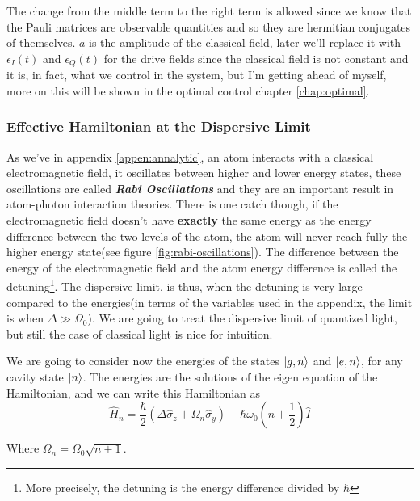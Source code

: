 \documentclass[english, a4paper, 12pt, twoside]{article}
\numberwithin{equation}{section} %
\begin{document}
The change from the middle term to the right term is allowed since we know that the Pauli matrices are observable quantities and so they are hermitian conjugates of themselves. $a$ is the amplitude of the classical field, later we'll replace it with $\epsilon_I(t)$ and $\epsilon_Q(t)$ for the drive fields since the classical field is not constant and it is, in fact, what we control in the system, but I'm getting ahead of myself, more on this will be shown in the optimal control chapter \ref{chap:optimal}.

\subsubsection{Effective Hamiltonian at the Dispersive Limit}
As we've in appendix \ref{appen:annalytic}, an atom interacts with a classical electromagnetic field, it oscillates between higher and lower energy states, these oscillations are called \textbf{\textit{Rabi Oscillations}} and they are an important result in atom-photon interaction theories. There is one catch though, if the electromagnetic field doesn't have \textbf{exactly} the same  energy as the energy difference between the two levels of the atom, the atom will never reach fully the higher energy state(see figure \ref{fig:rabi-oscillations}). The difference between the energy of the electromagnetic field and  the atom  energy difference is called  the  detuning\footnote{More precisely, the detuning is the energy difference divided by $\hbar$}. The dispersive limit, is thus, when the detuning is very large compared  to the energies(in terms of the variables used in the appendix, the limit is when $\Delta \gg \Omega_0$). We are going to treat the dispersive limit of quantized light, but still the case of classical light is nice for intuition.

We are going to consider now the energies of the states $\ket{g, n}$ and $\ket{e, n}$, for any cavity state $\ket{n}$. The energies are the solutions of the eigen equation of the Hamiltonian, and we can write this Hamiltonian as
\[
    \hat{H}_n = \frac{\hbar}{2}(\Delta \hat{\sigma}_z + \Omega_n \hat{\sigma}_y) + \hbar \omega_0 (n + \frac{1}{2})\hat{I}
\]

Where $\Omega_n = \Omega_0 \sqrt{n + 1}$.
\end{document}
